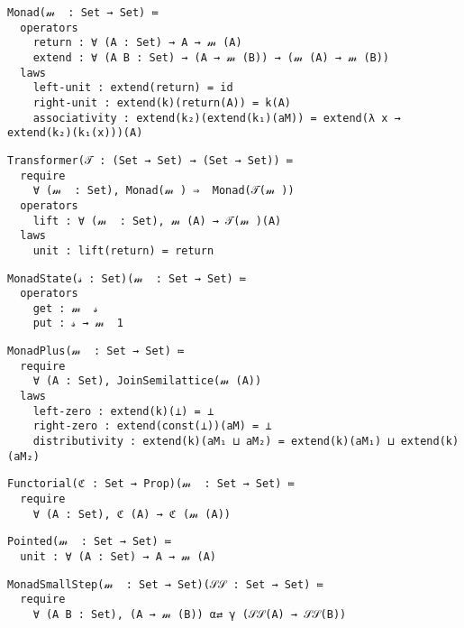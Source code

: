 \documentclass{article}
\begin{document}
\begin{verbatim}
Monad(𝓂  : Set → Set) ≔
  operators
    return : ∀ (A : Set) → A → 𝓂 (A)
    extend : ∀ (A B : Set) → (A → 𝓂 (B)) → (𝓂 (A) → 𝓂 (B))
  laws
    left-unit : extend(return) = id
    right-unit : extend(k)(return(A)) = k(A)
    associativity : extend(k₂)(extend(k₁)(aM)) = extend(λ x → extend(k₂)(k₁(x)))(A)
\end{verbatim}

\begin{verbatim}
Transformer(𝒯 : (Set → Set) → (Set → Set)) ≔
  require
    ∀ (𝓂  : Set), Monad(𝓂 ) ⇒  Monad(𝒯(𝓂 ))
  operators
    lift : ∀ (𝓂  : Set), 𝓂 (A) → 𝒯(𝓂 )(A)
  laws
    unit : lift(return) = return
\end{verbatim}

\begin{verbatim}
MonadState(𝓈 : Set)(𝓂  : Set → Set) ≔
  operators
    get : 𝓂  𝓈
    put : 𝓈 → 𝓂  1
\end{verbatim}

\begin{verbatim}
MonadPlus(𝓂  : Set → Set) ≔ 
  require
    ∀ (A : Set), JoinSemilattice(𝓂 (A))
  laws
    left-zero : extend(k)(⊥) = ⊥
    right-zero : extend(const(⊥))(aM) = ⊥
    distributivity : extend(k)(aM₁ ⊔ aM₂) = extend(k)(aM₁) ⊔ extend(k)(aM₂)
\end{verbatim}

\begin{verbatim}
Functorial(ℭ : Set → Prop)(𝓂  : Set → Set) ≔ 
  require
    ∀ (A : Set), ℭ (A) → ℭ (𝓂 (A))
\end{verbatim}

\begin{verbatim}
Pointed(𝓂  : Set → Set) ≔
  unit : ∀ (A : Set) → A → 𝓂 (A)
\end{verbatim}

\begin{verbatim}
MonadSmallStep(𝓂  : Set → Set)(𝒮𝒮 : Set → Set) ≔ 
  require
    ∀ (A B : Set), (A → 𝓂 (B)) α⇄ γ (𝒮𝒮(A) → 𝒮𝒮(B))
\end{verbatim}


\subsection{\ST}
\label{section:Proofs+Definitions:SetT}
\end{document}
